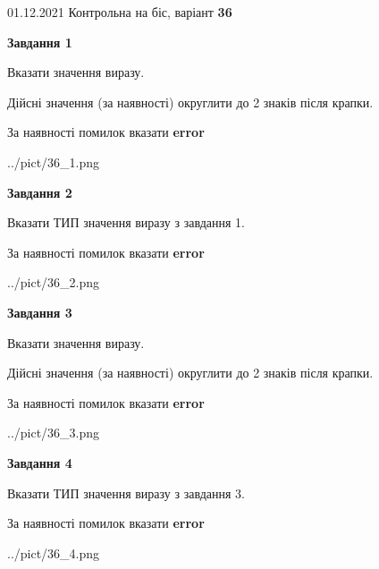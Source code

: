 \documentclass[11pt, ukrainian]{article}
\begin{document}
{01.12.2021 Контрольна на біс, варіант  \No \textbf { 36 }\par}
{
\begin {large}
{\begin {center}\textbf{Завдання 1}\end {center}}\par
Вказати значення виразу. \par
Дійсні значення (за наявності) округлити до 2 знаків після крапки. \par
За наявності помилок вказати \textbf{error}

\begin{center}
	{../pict/36_1.png}
\end{center}
\newpage

{\begin {center}\textbf{Завдання 2}\end {center}}\par
Вказати ТИП значення виразу з завдання 1. \par
За наявності помилок вказати \textbf{error}

\begin{center}
	{../pict/36_2.png}
\end{center}
\newpage

{\begin {center}\textbf{Завдання 3}\end {center}}\par
Вказати значення виразу. \par
Дійсні значення (за наявності) округлити до 2 знаків після крапки. \par
За наявності помилок вказати \textbf{error}

\begin{center}
	{../pict/36_3.png}
\end{center}
\newpage

{\begin {center}\textbf{Завдання 4}\end {center}}\par
Вказати ТИП значення виразу з завдання 3. \par
За наявності помилок вказати \textbf{error}

\begin{center}
	{../pict/36_4.png}
\end{center}
\newpage


\end{large}}
\end{document}
